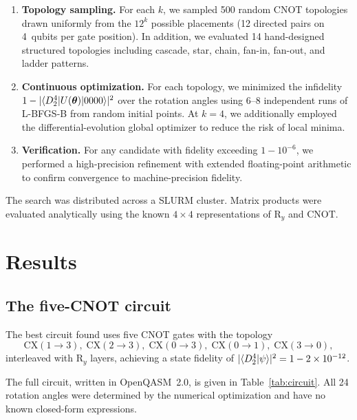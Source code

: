 \documentclass[twocolumn,10pt]{article}
\newcommand{\Ry}{\mathrm{R}_y}
\newcommand{\CNOT}{\mathrm{CNOT}}
\newcommand{\CX}{\mathrm{CX}}
\begin{document}
\begin{enumerate}
    \item \textbf{Topology sampling.} For each $k$, we sampled 500 random CNOT
    topologies drawn uniformly from the $12^k$ possible placements (12 directed
    pairs on 4~qubits per gate position). In addition, we evaluated 14
    hand-designed structured topologies including cascade, star, chain, fan-in,
    fan-out, and ladder patterns.

    \item \textbf{Continuous optimization.} For each topology, we minimized the
    infidelity $1 - |\!\braket{D_2^4 | U(\boldsymbol{\theta}) | 0000}\!|^2$ over
    the rotation angles using 6--8 independent runs of L-BFGS-B from random
    initial points. At $k=4$, we additionally employed the
    differential-evolution global optimizer to reduce the risk of local minima.

    \item \textbf{Verification.} For any candidate with fidelity exceeding
    $1 - 10^{-6}$, we performed a high-precision refinement with extended
    floating-point arithmetic to confirm convergence to machine-precision
    fidelity.
\end{enumerate}

The search was distributed across a SLURM cluster. Matrix products
were evaluated analytically using the known $4\times 4$ representations of
$\Ry$ and $\CNOT$.

\section{Results}
\label{sec:results}

\subsection{The five-CNOT circuit}

The best circuit found uses five CNOT gates with the topology
\begin{equation}\label{eq:topology}
    \CX(1\!\to\!3),\; \CX(2\!\to\!3),\; \CX(0\!\to\!3),\;
    \CX(0\!\to\!1),\; \CX(3\!\to\!0),
\end{equation}
interleaved with $\Ry$ layers, achieving a state fidelity of
$|\!\braket{D_2^4|\psi}\!|^2 = 1 - 2\times 10^{-12}$.

The full circuit, written in OpenQASM~2.0, is given in
Table~\ref{tab:circuit}. All 24 rotation angles were determined by the
numerical optimization and have no known closed-form expressions.
\end{document}
